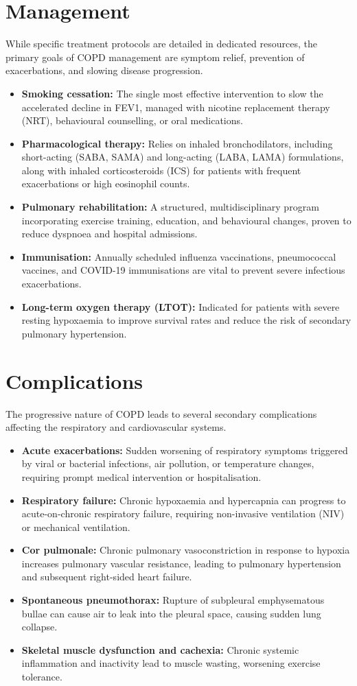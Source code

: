 \section*{Management}
While specific treatment protocols are detailed in dedicated resources, the primary goals of COPD management are symptom relief, prevention of exacerbations, and slowing disease progression.
\begin{itemize}
    \item \textbf{Smoking cessation:} The single most effective intervention to slow the accelerated decline in FEV1, managed with nicotine replacement therapy (NRT), behavioural counselling, or oral medications.
    \item \textbf{Pharmacological therapy:} Relies on inhaled bronchodilators, including short-acting (SABA, SAMA) and long-acting (LABA, LAMA) formulations, along with inhaled corticosteroids (ICS) for patients with frequent exacerbations or high eosinophil counts.
    \item \textbf{Pulmonary rehabilitation:} A structured, multidisciplinary program incorporating exercise training, education, and behavioural changes, proven to reduce dyspnoea and hospital admissions.
    \item \textbf{Immunisation:} Annually scheduled influenza vaccinations, pneumococcal vaccines, and COVID-19 immunisations are vital to prevent severe infectious exacerbations.
    \item \textbf{Long-term oxygen therapy (LTOT):} Indicated for patients with severe resting hypoxaemia to improve survival rates and reduce the risk of secondary pulmonary hypertension.
\end{itemize}

\section*{Complications}
The progressive nature of COPD leads to several secondary complications affecting the respiratory and cardiovascular systems.
\begin{itemize}
    \item \textbf{Acute exacerbations:} Sudden worsening of respiratory symptoms triggered by viral or bacterial infections, air pollution, or temperature changes, requiring prompt medical intervention or hospitalisation.
    \item \textbf{Respiratory failure:} Chronic hypoxaemia and hypercapnia can progress to acute-on-chronic respiratory failure, requiring non-invasive ventilation (NIV) or mechanical ventilation.
    \item \textbf{Cor pulmonale:} Chronic pulmonary vasoconstriction in response to hypoxia increases pulmonary vascular resistance, leading to pulmonary hypertension and subsequent right-sided heart failure.
    \item \textbf{Spontaneous pneumothorax:} Rupture of subpleural emphysematous bullae can cause air to leak into the pleural space, causing sudden lung collapse.
    \item \textbf{Skeletal muscle dysfunction and cachexia:} Chronic systemic inflammation and inactivity lead to muscle wasting, worsening exercise tolerance.
\end{itemize}

